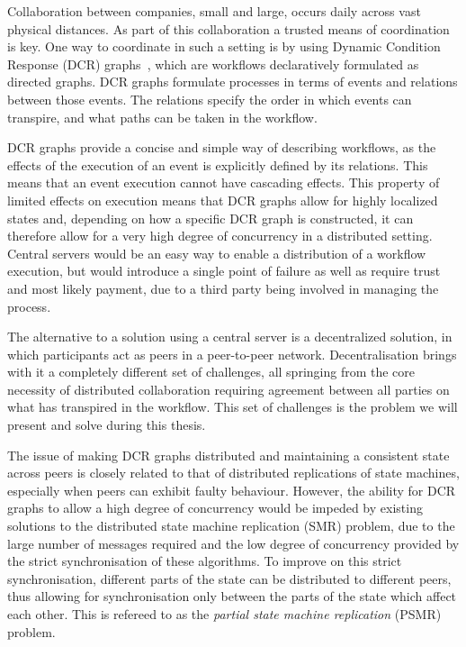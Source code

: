 \documentclass{article}
\begin{document}
	Collaboration between companies, small and large, occurs daily across vast physical distances.
	As part of this collaboration a trusted means of coordination is key.
	One way to coordinate in such a setting is by using Dynamic Condition Response (DCR) graphs~\cite{hildebrandt_declarative_2011}, which are workflows declaratively formulated as directed graphs.
	DCR graphs formulate processes in terms of events and relations between those events.
	The relations specify the order in which events can transpire, and what paths can be taken in the workflow.

	DCR graphs provide a concise and simple way of describing workflows, as the effects of the execution of an event is explicitly defined by its relations.
	This means that an event execution cannot have cascading effects.
	This property of limited effects on execution means that DCR graphs allow for highly localized states and, depending on how a specific DCR graph is constructed, it can therefore allow for a very high degree of concurrency in a distributed setting.
	Central servers would be an easy way to enable a distribution of a workflow execution, but would introduce a single point of failure as well as require trust and most likely payment, due to a third party being involved in managing the process.

	The alternative to a solution using a central server is a decentralized solution, in which participants act as peers in a peer-to-peer network.
	Decentralisation brings with it a completely different set of challenges, all springing from the core necessity of distributed collaboration requiring agreement between all parties on what has transpired in the workflow.
	This set of challenges is the problem we will present and solve during this thesis.

	The issue of making DCR graphs distributed and maintaining a consistent state across peers is closely related to that of distributed replications of state machines, especially when peers can exhibit faulty behaviour.
	However, the ability for DCR graphs to allow a high degree of concurrency would be impeded by existing solutions to the distributed state machine replication (SMR) problem, due to the large number of messages required and the low degree of concurrency provided by the strict synchronisation of these algorithms.
	To improve on this strict synchronisation, different parts of the state can be distributed to different peers, thus allowing for synchronisation only between the parts of the state which affect each other.
	This is refereed to as the \textit{partial state machine replication} (PSMR) problem.
\end{document}
